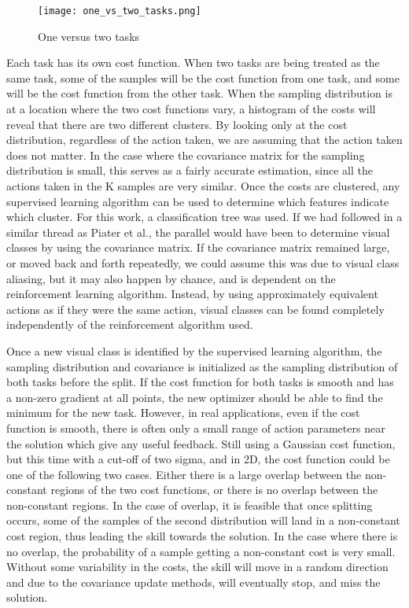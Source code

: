 \documentclass[12pt]{article}
\begin{document}
\begin{figure}[ht]
  \centering
  \texttt{[image: one\_vs\_two\_tasks.png]}
  \caption{\label{fig_label} One versus two tasks}
  \label{fig:1vs2tasks}
\end{figure} 

\color{red}Each task has its own cost function. When two tasks are being treated as the same task, some of the samples will be the cost function from one task, and some will be the cost function from the other task. \color{black} When the sampling distribution is at a location where the two cost functions vary, a histogram of the costs will reveal that there are two different clusters. By looking only at the cost distribution, regardless of the action taken, we are assuming that the action taken does not matter. In the case where the covariance matrix for the sampling distribution is small, this serves as a fairly accurate estimation, since all the actions taken in the K samples are very similar. Once the costs are clustered, any supervised learning algorithm can be used to determine which features indicate which cluster. For this work, a classification tree was used. If we had followed in a similar thread as Piater et al., the parallel would have been to determine visual classes by using the covariance matrix. If the covariance matrix remained large, or moved back and forth repeatedly, we could assume this was due to visual class aliasing, but it may also happen by chance, and is dependent on the reinforcement learning algorithm. Instead, by using approximately equivalent actions as if they were the same action, visual classes can be found completely independently of the reinforcement algorithm used. 

Once a new visual class is identified by the supervised learning algorithm, the sampling distribution and covariance is initialized as the sampling distribution of both tasks before the split. If the cost function for both tasks is smooth and has a non-zero gradient at all points, the new optimizer should be able to find the minimum for the new task. However, in real applications, even if the cost function is smooth, there is often only a small range of action parameters near the solution which give any useful feedback. Still using a Gaussian cost function, but this time with a cut-off of two sigma, and in 2D, the cost function could be one of the following two cases. Either there is a large overlap between the non-constant regions of the two cost functions, or there is no overlap between the non-constant regions. In the case of overlap, it is feasible that once splitting occurs, some of the samples of the second distribution will land in a non-constant cost region, thus leading the skill towards the solution. In the case where there is no overlap, the probability of a sample getting a non-constant cost is very small. Without some variability in the costs, the skill will move in a random direction and due to the covariance update methods, will eventually stop, and miss the solution.
 
\end{document}
